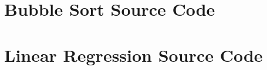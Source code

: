 \documentclass[10pt, twocolumn]{report}
\begin{document}
\begin{appendices}
	\chapter{Bubble Sort Source Code}
	
	
	

	\chapter{Linear Regression Source Code}
	
	
	
\end{appendices}
\end{document}
